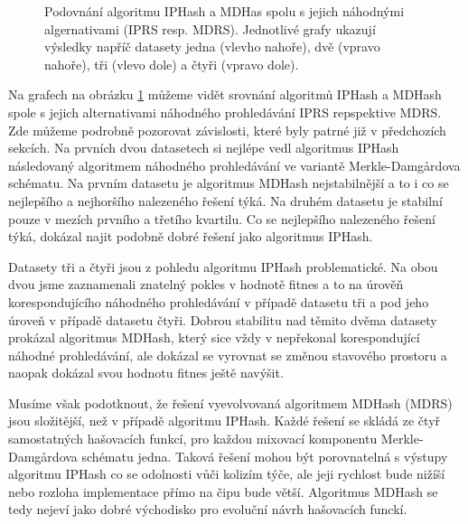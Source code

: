 \begin{figure}[!ht]
	\caption{Podovnání algoritmu IPHash a MDHas spolu s jejich náhodnými algernativami (IPRS resp. MDRS). Jednotlivé grafy ukazují výsledky napříč datasety
		jedna (vlevho nahoře), dvě (vpravo nahoře), tři (vlevo dole) a čtyři (vpravo dole).}
	\label{fig:conclusion_boxplot_1}
\end{figure}

Na grafech na obrázku \ref{fig:conclusion_boxplot_1} můžeme vidět srovnání algoritmů IPHash a MDHash spole s jejich alternativami náhodného prohledávání
IPRS repspektive MDRS. Zde můžeme podrobně pozorovat závislosti, které byly patrné již v předchozích sekcích. Na prvních dvou datasetech si nejlépe vedl
algoritmus IPHash následovaný algoritmem náhodného prohledávání ve variantě Merkle-Damg\r{a}rdova schématu. Na prvním datasetu je algoritmus MDHash
nejstabilnější a to i co se nejlepšího a nejhoršího nalezeného řešení týká. Na druhém datasetu je stabilní pouze v mezích prvního a třetího kvartilu. Co se nejlepšího
nalezeného řešení týká, dokázal najit podobně dobré řešení jako algoritmus IPHash.

Datasety tři a čtyři jsou z pohledu algoritmu IPHash problematické. Na obou dvou jsme zaznamenali znatelný pokles v hodnotě fitnes a to na úrověň korespondujícího
náhodného prohledávání v případě datasetu tři a pod jeho úroveň v případě datasetu čtyři. Dobrou stabilitu nad těmito dvěma datasety prokázal algoritmus MDHash, který
sice vždy v nepřekonal korespondující náhodné prohledávání, ale dokázal se vyrovnat se změnou stavového prostoru a naopak dokázal svou hodnotu fitnes ještě navýšit. 

Musíme však podotknout, že řešení vyevolvovaná algoritmem MDHash (MDRS) jsou složitější, než v případě algoritmu IPHash. Každé řešení se skládá ze čtyř samostatných
hašovacích funkcí, pro každou mixovací komponentu Merkle-Damg\r{a}rdova schématu jedna. Taková řešení mohou být porovnatelná s výstupy algoritmu IPHash co se
odolnosti vůči kolizím týče, ale jeji rychlost  bude nižíší nebo rozloha implementace přímo na čipu bude větší. Algoritmus MDHash se tedy nejeví jako dobré východisko pro
evoluční návrh hašovacích funckí. 

